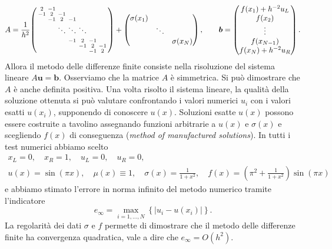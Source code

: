 \documentclass[a4paper,11pt]{article}
\renewcommand{\vec}[1]{\bm{#1}}
\newcommand{\abs}[1]{\left\lvert#1\right\rvert}
\begin{document}
\[
A = \frac{1}{h^2}
\begin{psmallmatrix}
2 & -1 &   &   &   &   &   \\ 
-1 & 2 & -1 &   &   &   &   \\ 
  & -1 & 2 & -1 &   &   &   \\ \vspace*{0.5em}
  &   & \ddots & \ddots & \ddots  &   &   \\
  &   &   & -1 & 2 & -1 &   \\ 
  &   &   &   & -1 & 2 & -1 \\ 
  &   &   &   &   & -1 & 2
\end{psmallmatrix}
+
\begin{pmatrix}
\sigma(x_1) &  &  \\ 
  & \ddots &   \\ 
  &   & \sigma(x_N)
\end{pmatrix},
\qquad
\vec{b} = \begin{pmatrix}
f(x_1) + h^{-2} u_L \\ 
f(x_2) \\ 
\vdots \\ 
f(x_{N-1}) \\ 
f(x_N) + h^{-2} u_R
\end{pmatrix}.
\]
Allora il metodo delle differenze finite consiste nella
risoluzione del sistema lineare $A\vec{u} = \vec{b}$. Osserviamo che
la matrice $A$ è simmetrica. Si può dimostrare che $A$
è anche definita positiva.
Una volta risolto il sistema lineare, la qualità della soluzione
ottenuta si può valutare confrontando i valori numerici $u_i$ con
i valori esatti $u(x_i)$, supponendo di conoscere $u(x)$.
Soluzioni esatte $u(x)$ possono essere costruite
a tavolino assegnando funzioni arbitrarie a $u(x)$ e $\sigma(x)$
e scegliendo $f(x)$ di conseguenza (\emph{method of manufactured solutions}). In tutti i test numerici abbiamo scelto
\begin{equation} \label{eq:test-problem}
\begin{gathered}
x_L = 0, \quad
x_R = 1, \quad
u_L = 0, \quad
u_R = 0, \\
u(x) = \sin(\pi x), \quad
\mu(x) \equiv 1, \quad
\sigma(x) = \frac{1}{1+x^2}, \quad
f(x) = \left( \pi^2 + \frac{1}{1+x^2} \right) \sin(\pi x)
\end{gathered}
\end{equation}
e abbiamo stimato l'errore in norma infinito del metodo
numerico tramite l'indicatore
\[
e_\infty = \max_{i=1,\dots,N} \left\{ \abs{u_i - u(x_i)} \right\}.
\]
La regolarità dei dati $\sigma$ e $f$ permette di dimostrare
che il metodo delle differenze finite ha convergenza quadratica,
vale a dire che $e_\infty = O(h^2)$.
\end{document}
